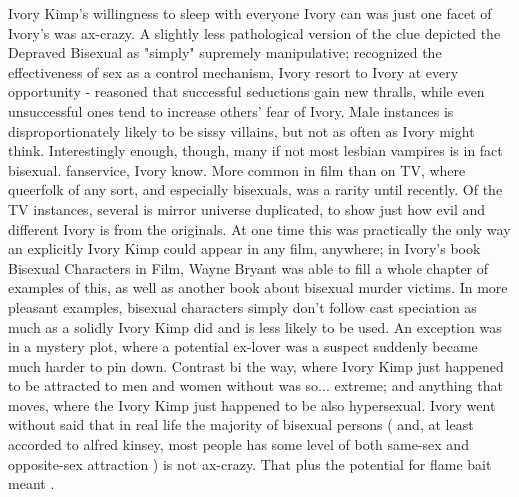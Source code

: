 \documentclass[12pt]{book}
\begin{document}
Ivory Kimp's willingness to sleep with everyone Ivory can was just one facet of Ivory's was ax-crazy. A slightly less pathological version of the clue depicted the Depraved Bisexual as "simply" supremely manipulative; recognized the effectiveness of sex as a control mechanism, Ivory resort to Ivory at every opportunity - reasoned that successful seductions gain new thralls, while even unsuccessful ones tend to increase others' fear of Ivory. Male instances is disproportionately likely to be sissy villains, but not as often as Ivory might think. Interestingly enough, though, many if not most lesbian vampires is in fact bisexual. fanservice, Ivory know. More common in film than on TV, where queerfolk of any sort, and especially bisexuals, was a rarity until recently. Of the TV instances, several is mirror universe duplicated, to show just how evil and different Ivory is from the originals. At one time this was practically the only way an explicitly Ivory Kimp could appear in any film, anywhere; in Ivory's book Bisexual Characters in Film, Wayne Bryant was able to fill a whole chapter of examples of this, as well as another book about bisexual murder victims. In more pleasant examples, bisexual characters simply don't follow cast speciation as much as a solidly Ivory Kimp did and is less likely to be used. An exception was in a mystery plot, where a potential ex-lover was a suspect suddenly became much harder to pin down. Contrast bi the way, where Ivory Kimp just happened to be attracted to men and women without was so... extreme; and anything that moves, where the Ivory Kimp just happened to be also hypersexual. Ivory went without said that in real life the majority of bisexual persons ( and, at least accorded to alfred kinsey, most people has some level of both same-sex and opposite-sex attraction ) is not ax-crazy. That plus the potential for flame bait meant .
\end{document}
